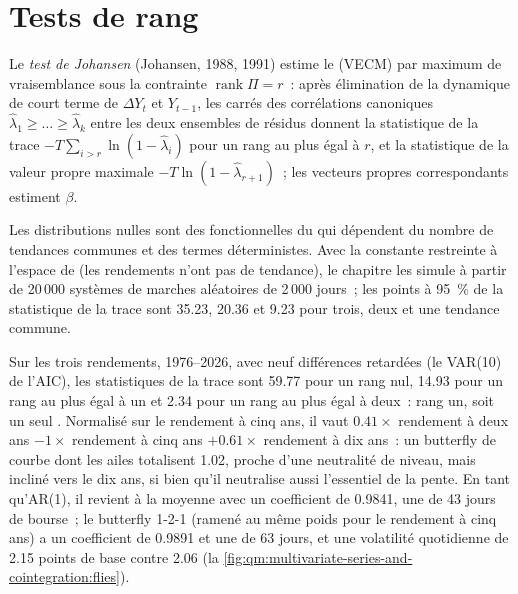 \section{Tests de rang}

\begin{definition}\label{def:qm:multivariate-series-and-cointegration:johansen}
Le \emph{test de Johansen} (Johansen, 1988, 1991) estime le  (VECM) par maximum de vraisemblance sous la contrainte $\operatorname{rank}\Pi = r$~:
après élimination de la dynamique de court terme de $\Delta Y_t$ et $Y_{t-1}$, les carrés des corrélations canoniques $\hat\lambda_1 \ge \dots \ge \hat\lambda_k$ entre les deux
ensembles de résidus donnent la statistique de la trace $-T\sum_{i>r}\ln(1 - \hat\lambda_i)$ pour un rang au plus égal à $r$, et la statistique de la valeur propre maximale $-T\ln(1 - \hat\lambda_{r+1})$~;
les vecteurs propres correspondants estiment $\beta$.
\end{definition}

Les distributions nulles sont des fonctionnelles du  qui dépendent du nombre de tendances communes et des termes déterministes. Avec la constante
restreinte à l'espace de  (les rendements n'ont pas de tendance), le chapitre les simule à partir de 20\,000 systèmes de marches aléatoires de 2\,000 jours~; les points à 95~\% de la
statistique de la trace sont 35.23, 20.36 et 9.23 pour trois, deux et une tendance commune.

Sur les trois rendements, 1976--2026, avec neuf différences retardées (le VAR(10) de l'AIC), les statistiques de la trace sont 59.77 pour un rang nul, 14.93 pour un rang au plus égal à un
et 2.34 pour un rang au plus égal à deux~: rang un, soit un seul . Normalisé sur le rendement à cinq ans, il vaut $0.41 \times$ rendement à deux ans $- 1 \times$ rendement à cinq ans $+ 0.61
\times$ rendement à dix ans~: un butterfly de courbe dont les ailes totalisent 1.02, proche d'une neutralité de niveau, mais incliné vers le dix ans, si bien qu'il neutralise aussi l'essentiel de la pente. En tant qu'AR(1),
il revient à la moyenne avec un coefficient de 0.9841, une  de 43 jours de bourse~; le butterfly 1-2-1 (ramené au même poids pour le rendement à cinq ans) a un coefficient de 0.9891 et une 
de 63 jours, et une volatilité quotidienne de 2.15 points de base contre 2.06 (la \cref{fig:qm:multivariate-series-and-cointegration:flies}).

